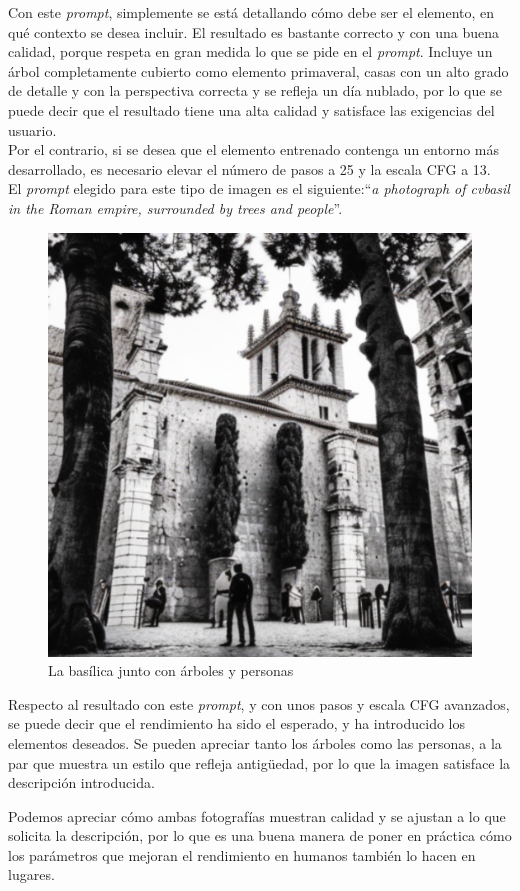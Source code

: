 Con este \textit{prompt}, simplemente se está detallando cómo debe ser el elemento, en qué contexto se desea incluir. El resultado es bastante correcto y con una buena calidad, porque respeta en gran medida lo que se pide en el \textit{prompt}. Incluye un árbol completamente cubierto como elemento primaveral, casas con un alto grado de detalle y con la perspectiva correcta y se refleja un día nublado, por lo que se puede decir que el resultado tiene una alta calidad y satisface las exigencias del usuario.\\

Por el contrario, si se desea que el elemento entrenado contenga un entorno más desarrollado, es necesario elevar el número de pasos a 25 y la escala CFG a 13. \\

El \textit{prompt} elegido para este tipo de imagen es el siguiente:``\textit{a photograph of cvbasil in the Roman empire, surrounded by trees and people}''.\\


\begin{figure}[!htb]
	\centering
	\includegraphics[width = 0.5
	\textwidth]{Imagenes/Vectorial/colmeb&n.png}
	\caption{La basílica junto con árboles y personas}
	\label{fig:cvbasilbyn}
\end{figure}

Respecto al resultado con este \textit{prompt}, y con unos pasos y escala CFG avanzados, se puede decir que el rendimiento ha sido el esperado, y ha introducido los elementos deseados. Se pueden apreciar tanto los árboles como las personas, a la par que muestra un estilo que refleja antigüedad, por lo que la imagen satisface la descripción introducida.

Podemos apreciar cómo ambas fotografías muestran calidad y se ajustan a lo que solicita la descripción, por lo que es una buena manera de poner en práctica cómo los parámetros que mejoran el rendimiento en humanos también lo hacen en lugares.

